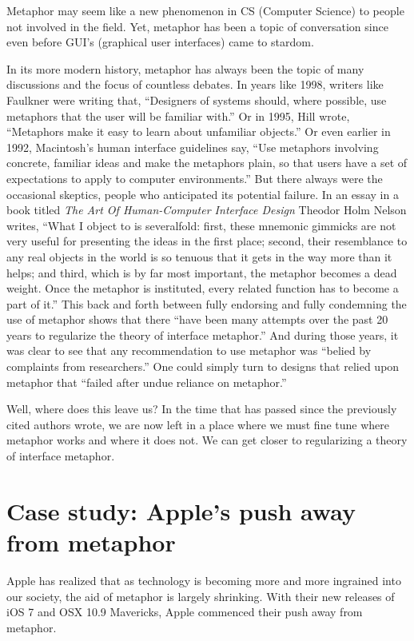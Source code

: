 \documentclass[11pt, oneside]{article}   	%
\begin{document}
Metaphor may seem like a new phenomenon in CS (Computer Science) to people not involved in the field. Yet, metaphor has been a topic of conversation since even before GUI's (graphical user interfaces) came to stardom.

In its more modern history, metaphor has always been the topic of many discussions and the focus of countless debates. In years like 1998, writers like Faulkner were writing that, ``Designers of systems should, where possible, use metaphors that the user will be familiar with.'' \cite{essence}  Or in 1995, Hill wrote, ``Metaphors make it easy to learn about unfamiliar objects.'' \cite{practical} Or even earlier in 1992, Macintosh's human interface guidelines say, ``Use metaphors involving concrete, familiar ideas and make the metaphors plain, so that users have a set of expectations to apply to computer environments.'' \cite{apple} But there always were the occasional skeptics, people who anticipated its potential failure. In an essay in a book titled \textit{The Art Of Human-Computer Interface Design} Theodor Holm Nelson writes, ``What I object to is severalfold: first, these mnemonic gimmicks are not very useful for presenting the ideas in the first place; second, their resemblance to any real objects in the world is so tenuous that it gets in the way more than it helps; and third, which is by far most important, the metaphor becomes a dead weight. Once the metaphor is instituted, every related function has to become a part of it.''\cite{art-hci} This back and forth between fully endorsing and fully condemning the use of metaphor shows that there ``have been many attempts over the past 20 years to regularize the theory of interface metaphor.'' And during those years, it was clear to see that any recommendation to use metaphor was ``belied by complaints from researchers.'' One could simply turn to designs that relied upon metaphor that ``failed after undue reliance on metaphor.'' \cite{reification}

Well, where does this leave us? In the time that has passed since the previously cited authors wrote, we are now left in a place where we must fine tune where metaphor works and where it does not. We can get closer to regularizing a theory of interface metaphor.

\section{Case study: Apple's push away from metaphor}
Apple has realized that as technology is becoming more and more ingrained into our society, the aid of metaphor is largely shrinking. With their new releases of iOS 7 and OSX 10.9 Mavericks, Apple commenced their push away from metaphor.
\end{document}
